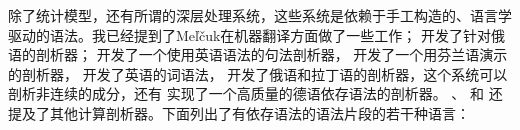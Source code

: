 除了统计模型，还有所谓的深层处理系统，这些系统是依赖于手工构造的、语言学驱动的语法。我已经提到了Meľčuk在机器翻译方面做了一些工作； \citet{HZ60a-u}开发了针对俄语的剖析器； \citet{SN86a}开发了一个使用英语语法的句法剖析器， \citet*{JLV86a-u}开发了一个用芬兰语演示的剖析器， \citet{Hellwig86a-u,Hellwig2003a,Hellwig2006a}开发了英语的词语法， \citet{Covington90a}开发了俄语和拉丁语的剖析器，这个系统可以剖析非连续的成分，还有 \citet{Menzel98a-u}实现了一个高质量的德语依存语法的剖析器。 \citet{Kettunen86a-u}、 \citet{Lehtola86a-u}和 \citet{MS98a-u}还提及了其他计算剖析器。下面列出了有依存语法的语法片段的若干种语言：

